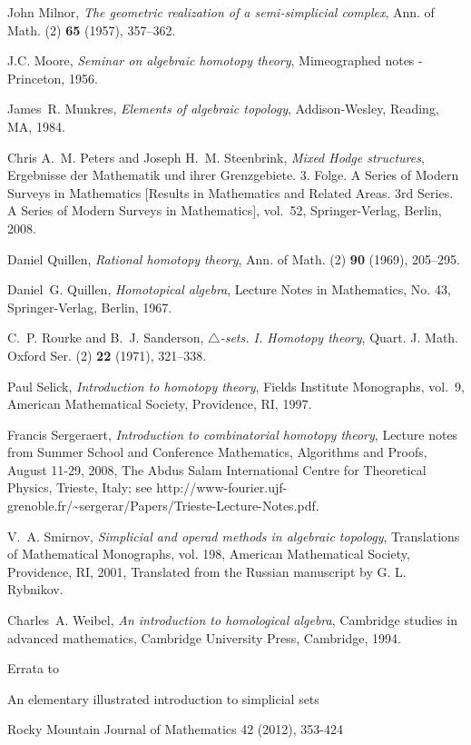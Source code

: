 \documentclass[12pt]{article}
\theoremstyle{plain}
\theoremstyle{definition}
\theoremstyle{remark}
\begin{document}
\begin{thebibliography}{10}
John Milnor, \emph{The geometric realization of a semi-simplicial complex},
  Ann. of Math. (2) \textbf{65} (1957), 357--362.

J.C. Moore, \emph{Seminar on algebraic homotopy theory}, Mimeographed notes -
  Princeton, 1956.

James~R. Munkres, \emph{Elements of algebraic topology}, Addison-Wesley,
  Reading, MA, 1984.

Chris A.~M. Peters and Joseph H.~M. Steenbrink, \emph{Mixed {H}odge
  structures}, Ergebnisse der Mathematik und ihrer Grenzgebiete. 3. Folge. A
  Series of Modern Surveys in Mathematics [Results in Mathematics and Related
  Areas. 3rd Series. A Series of Modern Surveys in Mathematics], vol.~52,
  Springer-Verlag, Berlin, 2008.

Daniel Quillen, \emph{Rational homotopy theory}, Ann. of Math. (2) \textbf{90}
  (1969), 205--295.

Daniel~G. Quillen, \emph{Homotopical algebra}, Lecture Notes in Mathematics,
  No. 43, Springer-Verlag, Berlin, 1967.

C.~P. Rourke and B.~J. Sanderson, \emph{{$\triangle $}-sets. {I}. {H}omotopy
  theory}, Quart. J. Math. Oxford Ser. (2) \textbf{22} (1971), 321--338.

Paul Selick, \emph{Introduction to homotopy theory}, Fields Institute
  Monographs, vol.~9, American Mathematical Society, Providence, RI, 1997.

Francis Sergeraert, \emph{Introduction to combinatorial homotopy theory},
  Lecture notes from Summer School and Conference Mathematics, Algorithms and
  Proofs, August 11-29, 2008, The Abdus Salam International Centre for
  Theoretical Physics, Trieste, Italy; see
  http://www-fourier.ujf-grenoble.fr/\~{}sergerar/Papers/Trieste-Lecture-Notes.pdf.

V.~A. Smirnov, \emph{Simplicial and operad methods in algebraic topology},
  Translations of Mathematical Monographs, vol. 198, American Mathematical
  Society, Providence, RI, 2001, Translated from the Russian manuscript by G.
  L. Rybnikov.

Charles~A. Weibel, \emph{An introduction to homological algebra}, Cambridge
  studies in advanced mathematics, Cambridge University Press, Cambridge, 1994.

\end{thebibliography}
\pagebreak
\begin{center}
{\Large
Errata to

An elementary illustrated introduction to simplicial sets 

Rocky Mountain Journal of Mathematics 42 (2012), 353-424 
}
\end{center}
\end{document}
